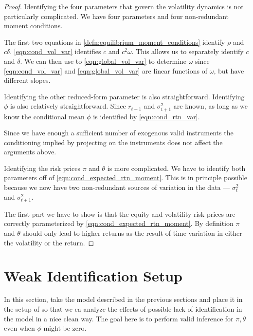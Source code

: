 \documentclass[11pt, letterpaper, twoside, final]{article}
\begin{document}
\begin{proof}
    Identifying the four parameters that govern the volatility dynamics is not particularly complicated. 
    We have four parameters and four non-redundant moment conditions.

    The first two equations in    \cref{defn:equilibrium_moment_conditions} identify $\rho$ and $c \delta$.
    \cref{eqn:cond_vol_var} identifies $c$ and $c^2 \omega$. 
    This allows us to separately identify $c$ and $\delta$.
    We can then use to  \cref{eqn:global_vol_var} to determine $\omega$ since \cref{eqn:cond_vol_var} and
    \cref{eqn:global_vol_var} are linear functions of $\omega$, but have different slopes. 
    
    Identifying the other reduced-form parameter is also straightforward. 
    Identifying $\phi$ is also relatively straightforward. Since $r_{t+1}$ and $\sigma^2_{t+1}$ are known, as long
    as we know the conditional mean $\phi$ is identified by \cref{eqn:cond_rtn_var}.
    
    Since we have enough a sufficient number of exogenous valid instruments the conditioning implied by projecting
    on the instruments does not affect the arguments above. 

    Identifying the risk prices $\pi$ and $\theta$ is more complicated.
    We have to identify both parameters off of \cref{eqn:cond_expected_rtn_moment}. 
    This is in principle possible because we now have two non-redundant sources of variation in the data ---
    $\sigma^2_t$ and $\sigma^2_{t+1}$.

    The first part we have to show is that the equity and volatility risk prices are correctly parameterized by
    \cref{eqn:cond_expected_rtn_moment}.
    By definition $\pi$ and $\theta$ should only lead to higher-returns as the result of time-variation in either
    the volatility or the return.
    
\end{proof}


\section{Weak Identification Setup}

In this section, take the model described in the previous sections and place it in the setup of
\textcite{andrews2014Gmm} so that we ca analyze the effects of possible lack of identification in the model in a
nice clean way.
The goal here is to perform valid inference for $\pi, \theta$ even when $\phi$ might be zero. 
\end{document}
